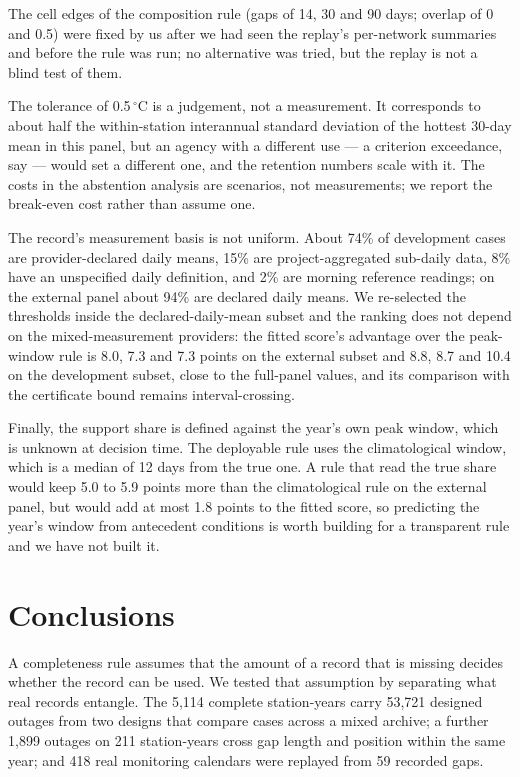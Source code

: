 \documentclass[draft]{agujournal2025}
\begin{document}
The cell edges of the composition rule (gaps of 14, 30 and 90 days; overlap of 0
and 0.5) were fixed by us after we had seen the replay's per-network summaries
and before the rule was run; no alternative was tried, but the replay is not a
blind test of them.

The tolerance of 0.5\,$^{\circ}$C is a judgement, not a measurement. It
corresponds to about half the within-station interannual standard deviation of
the hottest 30-day mean in this panel, but an agency with a different use --- a
criterion exceedance, say --- would set a different one, and the retention
numbers scale with it. The costs in the abstention analysis are scenarios, not
measurements; we report the break-even cost rather than assume one.

The record's measurement basis is not uniform. About 74\% of development cases
are provider-declared daily means, 15\% are project-aggregated sub-daily data,
8\% have an unspecified daily definition, and 2\% are morning reference readings;
on the external panel about 94\% are declared daily means. We re-selected the
thresholds inside the declared-daily-mean subset and the ranking does not depend
on the mixed-measurement providers: the fitted score's advantage over the
peak-window rule is 8.0, 7.3 and 7.3 points on the external subset and 8.8, 8.7
and 10.4 on the development subset, close to the full-panel values, and its
comparison with the certificate bound remains interval-crossing.

Finally, the support share is defined against the year's own peak window, which
is unknown at decision time. The deployable rule uses the climatological window,
which is a median of 12 days from the true one. A rule that read the true share
would keep 5.0 to 5.9 points more than the climatological rule on the external
panel, but would add at most 1.8 points to the fitted score, so predicting the
year's window from antecedent conditions is worth building for a transparent rule
and we have not built it.

\section{Conclusions}

A completeness rule assumes that the amount of a record that is missing decides
whether the record can be used. We tested that assumption by separating what real
records entangle. The 5{,}114 complete station-years carry 53{,}721 designed
outages from two designs that compare cases across a mixed archive; a further
1{,}899 outages on 211 station-years cross gap length and position within the same
year; and 418 real monitoring calendars were replayed from 59 recorded gaps.
\end{document}
